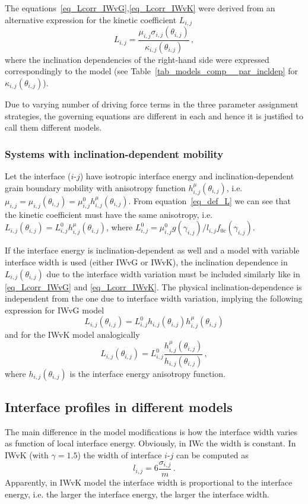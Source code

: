 The equations~\eqref{eq_Lcorr_IWvG},\eqref{eq_Lcorr_IWvK} were derived from an alternative expression for the kinetic coefficient $L_{i,j}$
\begin{equation}
	L_{i,j} = \frac{\mu_{i,j}\sigma_{i,j}(\theta_{i,j})}{\kappa_{i,j}(\theta_{i,j})} \,,
\end{equation}
where the inclination dependencies of the right-hand side were expressed correspondingly to the model (see Table~\ref{tab_models_comp__par_incldep} for $\kappa_{i,j}(\theta_{i,j})$).

Due to varying number of driving force terms in the three parameter assignment strategies, the governing equations are different in each and hence it is justified to call them different models.

\subsubsection{Systems with inclination-dependent mobility}
Let the interface ($i$-$j$) have isotropic interface energy and inclination-dependent grain boundary mobility with anisotropy function $h_{i,j}^\mu(\theta_{i,j})$, i.e. $\mu_{i,j}=\mu_{i,j}(\theta_{i,j})=\mu_{i,j}^0h_{i,j}^\mu(\theta_{i,j})$. From equation~\eqref{eq_def_L} we can see that the kinetic coefficient must have the same anisotropy, i.e. $L_{i,j}(\theta_{i,j})=L_{i,j}^0h_{i,j}^\mu(\theta_{i,j})$, where $L_{i,j}^0=\mu_{i,j}^0g(\gamma_{i,j})/l_{i,j}f_{0c}(\gamma_{i,j})$. 

If the interface energy is inclination-dependent as well and a model with variable interface width is used (either IWvG or IWvK), the inclination dependence in $L_{i,j}(\theta_{i,j})$ due to the interface width variation must be included similarly like in \eqref{eq_Lcorr_IWvG} and \eqref{eq_Lcorr_IWvK}. The physical inclination-dependence is independent from the one due to interface width variation, implying the following expression for IWvG model
\begin{equation}     
	L_{i,j}(\theta_{i,j}) = L_{i,j}^0h_{i,j}(\theta_{i,j})h_{i,j}^\mu(\theta_{i,j})
\end{equation}
and for the IWvK model analogically
\begin{equation}
	L_{i,j}(\theta_{i,j}) = L_{i,j}^0\frac{h_{i,j}^\mu(\theta_{i,j})}{h_{i,j}(\theta_{i,j})} \,,
\end{equation}
where $h_{i,j}(\theta_{i,j})$ is the interface energy anisotropy function.

\subsection{Interface profiles in different models} \label{sec_difference_in_profiles}
The main difference in the model modifications is how the interface width varies as function of local interface energy. Obviously, in IWc the width is constant. In IWvK (with $\gamma=1.5$) the width of interface $i$-$j$ can be computed as
\begin{equation}
	l_{i,j} = 6\frac{\sigma_{i,j}}{m} \,.
\end{equation}
Apparently, in IWvK model the interface width is proportional to the interface energy, i.e. the larger the interface energy, the larger the interface width.

